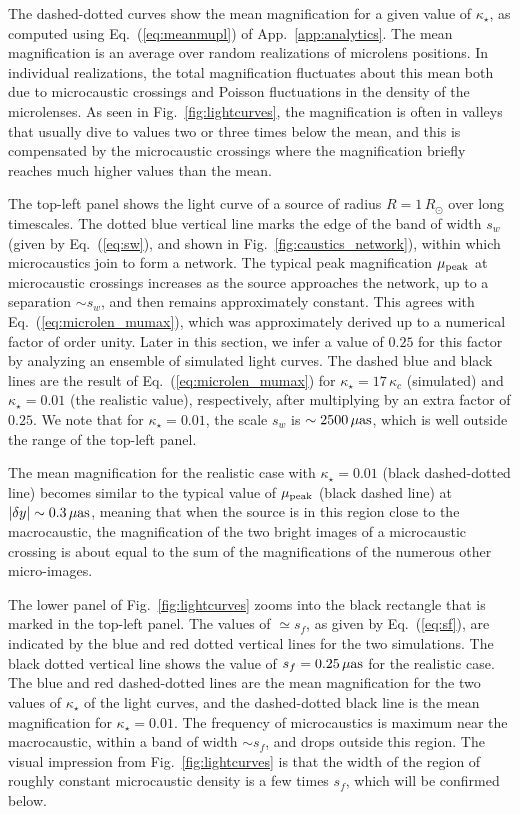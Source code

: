 \documentclass{aastex6}
\newcommand{\refeq}[1]{Eq.~(\ref{eq:#1})}
\newcommand{\reffig}[1]{Fig.~\ref{fig:#1}}
\newcommand{\refapp}[1]{App.~\ref{app:#1}}
\begin{document}
The dashed-dotted curves show the mean magnification for a given value of $\kappa_\star$, as computed using \refeq{meanmupl} of \refapp{analytics}. The mean magnification is an average over random realizations of microlens positions. In individual realizations, the total magnification fluctuates about this mean both due to microcaustic crossings and Poisson fluctuations in the density of the microlenses. As seen in \reffig{lightcurves},  the magnification is often in valleys that usually dive to values two or three times below the mean, and this is compensated by the microcaustic crossings where the magnification briefly reaches much higher values than the mean. 


The top-left panel shows the light curve of a source of radius $R = 1\,R_\odot$ over long timescales. The dotted blue vertical line marks the edge of the band of width $s_w$ (given by \refeq{sw}, and shown in \reffig{caustics_network}), within which microcaustics join to form a network. The typical peak magnification $\mu_{\rm peak}$ at microcaustic crossings increases as the source approaches the network, up to a separation $\sim s_w$, and then remains approximately constant. This agrees with \refeq{microlen_mumax}, which was approximately derived up to a numerical factor of order unity. Later in this section, we infer a value of $0.25$ for this factor by analyzing an ensemble of simulated light curves. The dashed blue and black lines are the result of \refeq{microlen_mumax} for $\kappa_\star = 17\,\kappa_c$ (simulated) and $\kappa_\star = 0.01$ (the realistic value), respectively, after multiplying by an extra factor of $0.25$. We note that for $\kappa_\star = 0.01$, the scale $s_w$ is $\sim 2500\, \mu{\rm as}$, which is well outside the range of the top-left panel.

 The mean magnification for the realistic case with $\kappa_\star=0.01$ (black dashed-dotted line) becomes similar to the typical value of $\mu_{\rm peak}$ (black dashed line) at $| \delta y| \sim 0.3\, \mu{\rm as}$, meaning that when the source is in this region close to the macrocaustic, the magnification of the two bright images of a microcaustic crossing is about equal to the sum of the magnifications of the numerous other micro-images.
 
The lower panel of \reffig{lightcurves} zooms into the black rectangle that is marked in the top-left panel. The values of $\simeq s_f$, as given by \refeq{sf}, are indicated by the blue and red dotted vertical lines for the two simulations. The black dotted vertical line shows the value of $s_f = 0.25 \, \mu{\rm as}$ for the realistic case. The blue and red dashed-dotted lines are the mean magnification for the two values of $\kappa_\star$ of the light curves, and the dashed-dotted black line is the mean magnification for $\kappa_\star = 0.01$. The frequency of microcaustics is maximum near the macrocaustic, within a band of width $\sim s_f$, and drops outside this region. The visual impression from \reffig{lightcurves} is that the width of the region of roughly constant microcaustic density is a few times $s_f$, which will be confirmed below.
\end{document}
